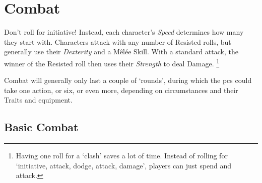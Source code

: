\chapter[The Arena]{Combat}
\label{combat}

Don't roll for initiative!
Instead, each character's \textit{Speed} determines how many  they start with. 
Characters attack with any number of Resisted rolls, but generally use their \textit{Dexterity} and a M\^{e}l\'ee Skill.
With a standard attack, the winner of the Resisted roll then uses their \textit{Strength} to deal Damage.%
\footnote{Having one roll for a `clash' saves a lot of time.  Instead of rolling for `initiative, attack, dodge, attack, damage', players can just spend  and attack.}

Combat will generally only last a couple of `rounds', during which the \glspl{pc} could take one action, or six, or even more, depending on circumstances and their Traits and equipment.

\section{Basic Combat}

